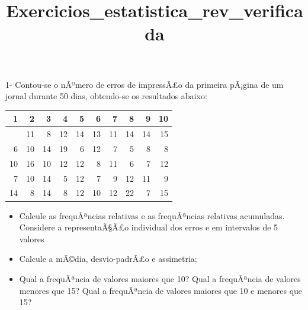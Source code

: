 ﻿\documentclass[11pt]{article}
\title{Exercicios\_estatistica\_rev\_verificada}
\providecommand{\tightlist}{%
      \setlength{\itemsep}{0pt}\setlength{\parskip}{0pt}}
\begin{document}
    
    \maketitle
    
    

    
    1- Contou-se o nÃºmero de erros de impressÃ£o da primeira pÃ¡gina de um
jornal durante 50 dias, obtendo-se os resultados abaixo:

{\def\LTcaptype{table} %
\begin{longtable}[]{@{}rrrrrrrrrr@{}}
\toprule\noalign{}
1 & 2 & 3 & 4 & 5 & 6 & 7 & 8 & 9 & 10 \\
\midrule\noalign{}
\endhead
\bottomrule\noalign{}
\endlastfoot
8 & 11 & 8 & 12 & 14 & 13 & 11 & 14 & 14 & 15 \\
6 & 10 & 14 & 19 & 6 & 12 & 7 & 5 & 8 & 8 \\
10 & 16 & 10 & 12 & 12 & 8 & 11 & 6 & 7 & 12 \\
7 & 10 & 14 & 5 & 12 & 7 & 9 & 12 & 11 & 9 \\
14 & 8 & 14 & 8 & 12 & 10 & 12 & 22 & 7 & 15 \\
\end{longtable}
}

    \begin{itemize}
\tightlist
\item
  Calcule as frequÃªncias relativas e as frequÃªncias relativas
  acumuladas. Considere a representaÃ§Ã£o individual dos erros e em
  intervalos de 5 valores
\item
  Calcule a mÃ©dia, desvio-padrÃ£o e assimetria;\\
\item
  Qual a frequÃªncia de valores maiores que 10? Qual a frequÃªncia de
  valores menores que 15? Qual a frequÃªncia de valores maiores que 10 e
  menores que 15?
\end{itemize}
\end{document}
